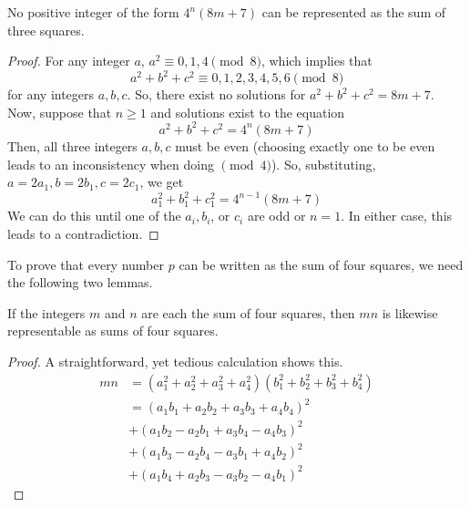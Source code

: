 \documentclass{article}
\newcounter{theorem}[section]
\begin{document}
\begin{theorem}
  \label{thm:integers-not-representable-as-a-sum-of-three}
No positive integer of the form $4^n (8m+7)$ can be represented as the sum of three squares. 
\end{theorem}
\begin{proof}
For any integer $a$, $a^2 \equiv 0, 1, 4 \pmod{8}$, which implies that
\begin{equation}
  a^2 + b^2 + c^2 \equiv 0, 1, 2, 3, 4, 5, 6 \pmod{8}
\end{equation}
for any integers $a, b, c$. So, there exist no solutions for $a^2 + b^2 + c^2 = 8m + 7$. Now, suppose that $n\geq 1$ and solutions exist to the equation
\begin{equation}
  a^2 + b^2 + c^2 = 4^n (8m + 7)
\end{equation}
Then, all three integers $a, b, c$ must be even (choosing exactly one to be even leads to an inconsistency when doing $\pmod{4}$). So, substituting, $a = 2 a_1, b = 2b_1, c= 2c_1$, we get 
\begin{equation}
  a_1^2 + b_1^2 + c_1^2 = 4^{n-1} (8m+7)
\end{equation}
We can do this until one of the $a_i, b_i$, or $c_i$ are odd or $n = 1$. In either case, this leads to a contradiction. 
\end{proof}

To prove that every number $p$ can be written as the sum of four squares, we need the following two lemmas. 

\begin{lemma}[Euler]
  \label{thm:euler}
If the integers $m$ and $n$ are each the sum of four squares, then $m n$ is likewise representable as sums of four squares. 
\end{lemma}
\begin{proof}
A straightforward, yet tedious calculation shows this. 
\begin{align*}
    m n & = (a_1^2 + a_2^2 + a_3^2 + a_4^2) (b_1^2 + b_2^2 + b_3^2 + b_4^2) \\
    & = (a_1 b_1 + a_2 b_2 + a_3 b_3 + a_4 b_4)^2 \\
    & + (a_1 b_2 - a_2 b_1 + a_3 b_4 - a_4 b_3)^2 \\
    & + (a_1 b_3 - a_2 b_4 - a_3 b_1 + a_4 b_2)^2 \\
    & + (a_1 b_4 + a_2 b_3 - a_3 b_2 - a_4 b_1)^2
\end{align*}
\end{proof}
\end{document}
